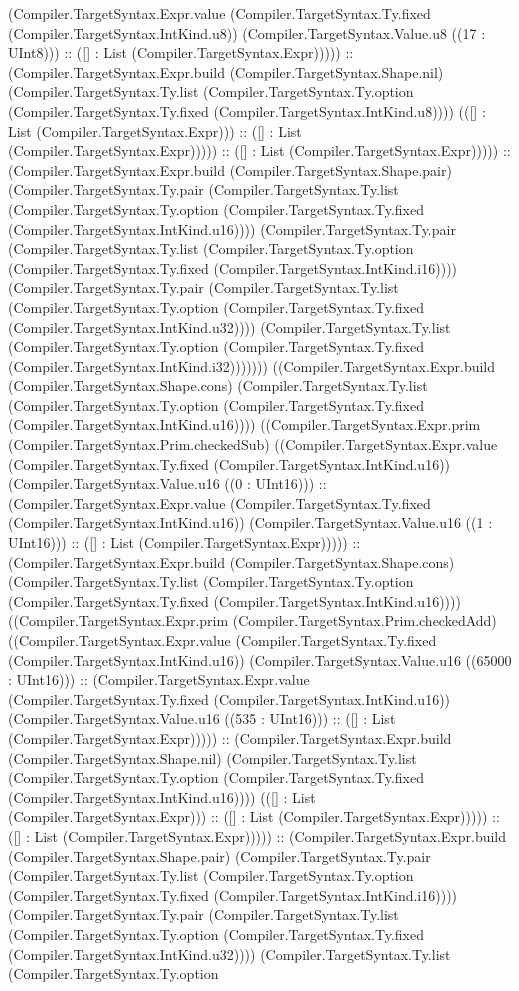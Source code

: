 \documentclass[11pt]{article}
\begin{document}
(Compiler.TargetSyntax.Expr.value (Compiler.TargetSyntax.Ty.fixed (Compiler.TargetSyntax.IntKind.u8)) (Compiler.TargetSyntax.Value.u8 ((17 : UInt8))) :: ([] : List (Compiler.TargetSyntax.Expr))))) :: (Compiler.TargetSyntax.Expr.build (Compiler.TargetSyntax.Shape.nil) (Compiler.TargetSyntax.Ty.list (Compiler.TargetSyntax.Ty.option (Compiler.TargetSyntax.Ty.fixed (Compiler.TargetSyntax.IntKind.u8)))) (([] : List (Compiler.TargetSyntax.Expr))) :: ([] : List (Compiler.TargetSyntax.Expr))))) :: ([] : List (Compiler.TargetSyntax.Expr))))) :: (Compiler.TargetSyntax.Expr.build (Compiler.TargetSyntax.Shape.pair) (Compiler.TargetSyntax.Ty.pair (Compiler.TargetSyntax.Ty.list (Compiler.TargetSyntax.Ty.option (Compiler.TargetSyntax.Ty.fixed (Compiler.TargetSyntax.IntKind.u16)))) (Compiler.TargetSyntax.Ty.pair (Compiler.TargetSyntax.Ty.list (Compiler.TargetSyntax.Ty.option (Compiler.TargetSyntax.Ty.fixed (Compiler.TargetSyntax.IntKind.i16)))) (Compiler.TargetSyntax.Ty.pair (Compiler.TargetSyntax.Ty.list (Compiler.TargetSyntax.Ty.option (Compiler.TargetSyntax.Ty.fixed (Compiler.TargetSyntax.IntKind.u32)))) (Compiler.TargetSyntax.Ty.list (Compiler.TargetSyntax.Ty.option (Compiler.TargetSyntax.Ty.fixed (Compiler.TargetSyntax.IntKind.i32))))))) ((Compiler.TargetSyntax.Expr.build (Compiler.TargetSyntax.Shape.cons) (Compiler.TargetSyntax.Ty.list (Compiler.TargetSyntax.Ty.option (Compiler.TargetSyntax.Ty.fixed (Compiler.TargetSyntax.IntKind.u16)))) ((Compiler.TargetSyntax.Expr.prim (Compiler.TargetSyntax.Prim.checkedSub) ((Compiler.TargetSyntax.Expr.value (Compiler.TargetSyntax.Ty.fixed (Compiler.TargetSyntax.IntKind.u16)) (Compiler.TargetSyntax.Value.u16 ((0 : UInt16))) :: (Compiler.TargetSyntax.Expr.value (Compiler.TargetSyntax.Ty.fixed (Compiler.TargetSyntax.IntKind.u16)) (Compiler.TargetSyntax.Value.u16 ((1 : UInt16))) :: ([] : List (Compiler.TargetSyntax.Expr))))) :: (Compiler.TargetSyntax.Expr.build (Compiler.TargetSyntax.Shape.cons) (Compiler.TargetSyntax.Ty.list (Compiler.TargetSyntax.Ty.option (Compiler.TargetSyntax.Ty.fixed (Compiler.TargetSyntax.IntKind.u16)))) ((Compiler.TargetSyntax.Expr.prim (Compiler.TargetSyntax.Prim.checkedAdd) ((Compiler.TargetSyntax.Expr.value (Compiler.TargetSyntax.Ty.fixed (Compiler.TargetSyntax.IntKind.u16)) (Compiler.TargetSyntax.Value.u16 ((65000 : UInt16))) :: (Compiler.TargetSyntax.Expr.value (Compiler.TargetSyntax.Ty.fixed (Compiler.TargetSyntax.IntKind.u16)) (Compiler.TargetSyntax.Value.u16 ((535 : UInt16))) :: ([] : List (Compiler.TargetSyntax.Expr))))) :: (Compiler.TargetSyntax.Expr.build (Compiler.TargetSyntax.Shape.nil) (Compiler.TargetSyntax.Ty.list (Compiler.TargetSyntax.Ty.option (Compiler.TargetSyntax.Ty.fixed (Compiler.TargetSyntax.IntKind.u16)))) (([] : List (Compiler.TargetSyntax.Expr))) :: ([] : List (Compiler.TargetSyntax.Expr))))) :: ([] : List (Compiler.TargetSyntax.Expr))))) :: (Compiler.TargetSyntax.Expr.build (Compiler.TargetSyntax.Shape.pair) (Compiler.TargetSyntax.Ty.pair (Compiler.TargetSyntax.Ty.list (Compiler.TargetSyntax.Ty.option (Compiler.TargetSyntax.Ty.fixed (Compiler.TargetSyntax.IntKind.i16)))) (Compiler.TargetSyntax.Ty.pair (Compiler.TargetSyntax.Ty.list (Compiler.TargetSyntax.Ty.option (Compiler.TargetSyntax.Ty.fixed (Compiler.TargetSyntax.IntKind.u32)))) (Compiler.TargetSyntax.Ty.list (Compiler.TargetSyntax.Ty.option 
\end{document}
